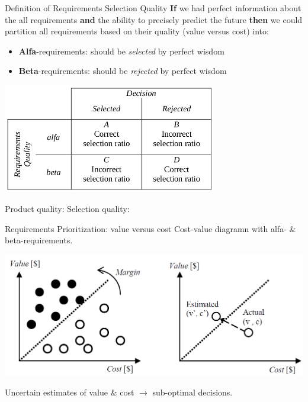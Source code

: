\documentclass{beamer}
\begin{document}
\begin{frame}[fragile]{Definition of Requirements Selection Quality}
\footnotesize
\textbf{If} we had perfect information about the all requirements \textbf{and} the ability to precisely predict the future \textbf{then} we could partition all requirements based on their quality (value versus cost) into:
\begin{itemize}\footnotesize
\item \textbf{Alfa}-requirements: should be \textit{selected} by perfect wisdom
\item \textbf{Beta}-requirements: should be \textit{rejected} by perfect wisdom
\end{itemize}
\begin{center}
\includegraphics[width=0.7\textwidth]{img/alfa-beta-reqts}
\end{center}
{
Product quality: \hfill
Selection quality:
}
\end{frame}



\begin{frame}[fragile]{Requirements Prioritization: value versus cost}
Cost-value diagramn with alfa- \& beta-requirements.
\begin{center}
\includegraphics[width=1.0\textwidth]{img/cost-value}
\end{center}
Uncertain estimates of value \& cost $\rightarrow$ sub-optimal decisions.
\end{frame}
\end{document}
